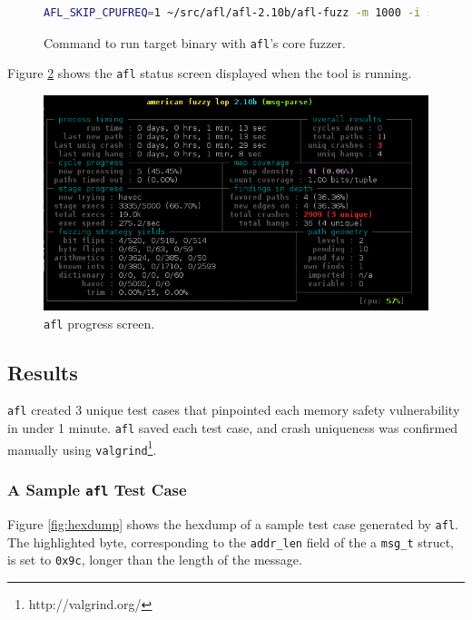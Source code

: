 \begin{figure}[H]
    \begin{lstlisting}[language=bash]
AFL_SKIP_CPUFREQ=1 ~/src/afl/afl-2.10b/afl-fuzz -m 1000 -i seeds/ -o output/ ~/src/afl/fuzz/a.out @@
\end{lstlisting}
\caption{Command to run target binary with \texttt{afl}'s core fuzzer.}
\label{fig:afl-run}
\end{figure}

Figure \ref{fig:afl-status} shows the \texttt{afl} status screen displayed when
the tool is running.

\begin{figure}[H]
\includegraphics[scale=0.6]{figures/afl-run}
\caption{\texttt{afl} progress screen.}
\label{fig:afl-status}
\end{figure}

\subsection{Results}

\texttt{afl} created 3 unique test cases that pinpointed each memory
safety vulnerability in under 1 minute. \texttt{afl} saved each test case, and
crash uniqueness was confirmed manually using
\texttt{valgrind}\footnote{http://valgrind.org/}.

\subsubsection{A Sample \texttt{afl} Test Case}

Figure \ref{fig:hexdump} shows the hexdump of a sample test case generated by
\texttt{afl}. The highlighted byte,
corresponding to the \texttt{addr\_len} field of the a \texttt{msg\_t} struct,
is set to \texttt{0x9c}, longer than the length of the message.


